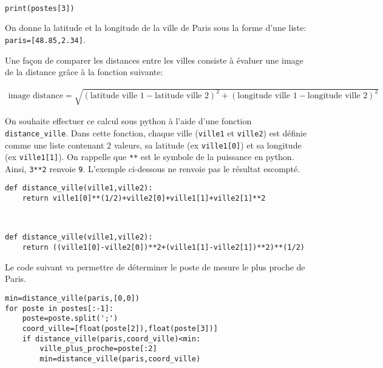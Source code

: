 
\begin{solution}~\ \\
\begin{verbatim}
print(postes[3])
\end{verbatim}
\end{solution}

On donne la latitude et la longitude de la ville de Paris sous la forme d'une liste: \verb?paris=[48.85,2.34]?.

Une façon de comparer les distances entre les villes consiste à évaluer une image de la distance grâce à la fonction suivante:

\begin{eqnarray}
\text{image distance}=\sqrt{(\text{latitude ville 1}-\text{latitude ville 2})^2+(\text{longitude ville 1}-\text{longitude ville 2})^2}\label{eq_dist}
\end{eqnarray}

On souhaite effectuer ce calcul sous python à l'aide d'une fonction \texttt{distance\_ville}. Dans cette fonction, chaque ville (\verb?ville1? et \verb?ville2?) est définie comme une liste contenant 2 valeurs, sa latitude (ex \verb?ville1[0]?) et sa longitude (ex \verb?ville1[1]?). On rappelle que \verb?**? est le symbole de la puissance en python. Ainsi, \verb?3**2? renvoie \verb?9?. L'exemple ci-dessous ne renvoie pas le résultat escompté.

\begin{verbatim}
def distance_ville(ville1,ville2):
    return ville1[0]**(1/2)+ville2[0]+ville1[1]+ville2[1]**2
\end{verbatim}


\begin{solution}~\ \\
\begin{verbatim}
def distance_ville(ville1,ville2):
    return ((ville1[0]-ville2[0])**2+(ville1[1]-ville2[1])**2)**(1/2)
\end{verbatim}
\end{solution}

Le code suivant va permettre de déterminer le poste de mesure le plus proche de Paris.

\begin{verbatim}
min=distance_ville(paris,[0,0])
for poste in postes[:-1]:
    poste=poste.split(';')
    coord_ville=[float(poste[2]),float(poste[3])]
    if distance_ville(paris,coord_ville)<min:
        ville_plus_proche=poste[:2]
        min=distance_ville(paris,coord_ville)
\end{verbatim}


